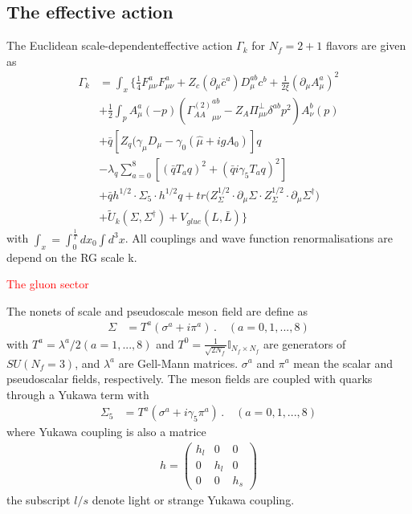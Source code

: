 \documentclass[%
reprint,
superscriptaddress,
showpacs,preprintnumbers,
amsmath,amssymb,
aps,
prd,
]{revtex4-1}
\begin{document}
\subsection{The effective action}\label{sec:effective_action}

The  Euclidean  scale-dependenteffective  action $\Gamma_k$ for $N_f=2+1$ flavors are given as 
\begin{align}
\Gamma_k&=\int_x\bigg \{ \frac{1}{4} F_{\mu\nu}^a F_{\mu\nu}^a+Z_c (\partial_\mu \bar c^a) D_{\mu}^{a b} c^{b}+\frac{1}{2\xi}(\partial_\mu A_{\mu}^{a})^2\\ \nonumber
&+\frac{1}{2}\int_p A^a_{\mu}(-p) ({\Gamma_{AA}^{(2)}}_{\mu \nu}^{ab}-Z_A \Pi_{\mu \nu}^{\perp}\delta^{ab} p^2)A _{\nu}^b(p)\\  \nonumber
&+\bar q [Z_q (\gamma_\mu D_\mu-\gamma_0(\hat \mu+ig A_0)]q \\  \nonumber
&-\lambda_q \sum_{a=0}^8 [(\bar q T_a  q)^2+(\bar q i \gamma _5 T_a q)^2]\\  \nonumber
&+\bar q  h^{1/2}  \cdot \Sigma_{5} \cdot h^{1/2} q+tr \big (Z_{\Sigma}^{1/2} \cdot \partial_\mu\Sigma \cdot Z_{\Sigma}^{1/2}\cdot \partial_\mu\Sigma^\dagger\bigr)  \\  \nonumber
&+\tilde U_k(\Sigma,\Sigma^\dagger)+V_{glue}(L,\bar L)
\bigg \}\label{}
\end{align}
with $\int_x=\int_0^{\frac{1}{T}} d x_0 \int d^3 x$. All couplings and wave function renormalisations are depend on the RG scale k.  

\textcolor{red}{The gluon sector}

The nonets of scale and pseudoscale meson field are define as 
\begin{align}
  \Sigma&=T^a(\sigma^a+i \pi^a)\,. \quad (a=0,1,...,8)
\end{align}
with $T^a=\lambda^a/2(a=1,...,8)$ and $T^{0}=\frac{1}{\sqrt{2N_{f}}}\mathbb{I}_{N_{f}\times N_{f}}$ are generators of $SU(N_f=3)$, and  $\lambda^a$ are  Gell-Mann matrices.  $\sigma^a$ and $\pi^a$ mean the scalar and pseudoscalar fields, respectively.  The meson fields are coupled with quarks through a Yukawa term with
\begin{align}\label{}
  \Sigma_5&=T^a(\sigma^a+i \gamma_5 \pi^a)\,. \quad (a=0,1,...,8)
\end{align}
where Yukawa coupling is also a matrice
\begin{align}
h=\begin{pmatrix} 
h_{l}&0&0\\
0&h_{l}&0\\
0&0&h_{s}
\end{pmatrix}
\end{align}
the subscript $l/s$ denote light or strange Yukawa coupling. 
\end{document}
